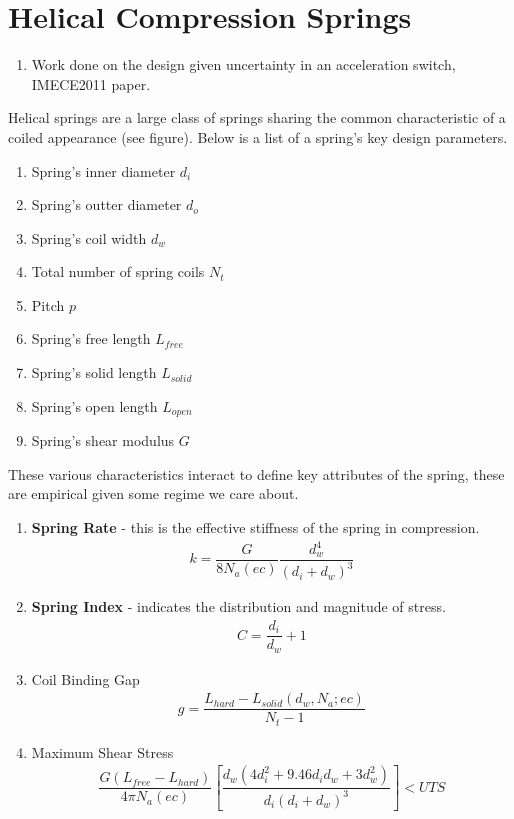 \documentclass[11pt]{article}
\begin{document}
	\section{Helical Compression Springs}
	
	\begin{enumerate}
		
		\item Work done on the design given uncertainty in an acceleration switch, IMECE2011 paper.
		
	\end{enumerate}
		

Helical springs are a large class of springs sharing the common characteristic of a coiled appearance (see figure).  Below is a list of a spring's key design parameters.

		\begin{enumerate}
			\item Spring's inner diameter $d_{i}$ 
			\item Spring's outter diameter $d_{o}$
			\item Spring's coil width $d_{w}$
			\item Total number of spring coils $N_{t}$
			\item Pitch $p$
			\item Spring's free length $L_{free}$
			\item Spring's solid length $L_{solid}$
			\item Spring's open length $L_{open}$
			\item Spring's shear modulus $G$
		\end{enumerate}

These various characteristics interact to define key attributes of the spring, these are empirical given some regime we care about.

	\begin{enumerate}
		\item \textbf{Spring Rate} - this is the effective stiffness of the spring in compression.
\begin{align*}
		k = \dfrac{G}{8 N_{a} (ec)} \dfrac{d_{w}^{4}}{(d_{i}+d_{w})^{3}}
\end{align*}
		\item \textbf{Spring Index} - indicates the distribution and magnitude of stress.
\begin{align*}
		C = \dfrac{d_{i}}{d_{w}} + 1
\end{align*}
		\item Coil Binding Gap
\begin{align*}
	g = \dfrac{L_{hard} - L_{solid}(d_{w},N_{a}; ec)}{N_{t} - 1}
\end{align*}
		\item Maximum Shear Stress
\begin{align*}
		\dfrac{G(L_{free} - L_{hard})}{4 \pi N_{a} (ec)} [\dfrac{d_{w} (4d_{i}^{2} + 9.46d_{i} 
d_{w} + 3 d_{w}^{2})}{d_{i}(d_{i}+d_{w})^{3}}] < UTS
\end{align*}
	\end{enumerate}
\end{document}
